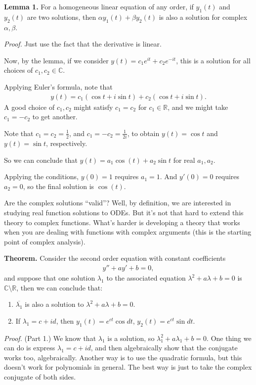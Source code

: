 \documentclass{article}
\begin{document}
{\bf Lemma 1.} For a homogeneous linear equation of any order, if $y_1(t)$ and $y_2(t)$ are two solutions, then $\alpha y_1(t) + \beta y_2(t)$ is also a solution for complex $\alpha, \beta$.

{\it Proof.} Just use the fact that the derivative is linear.

Now, by the lemma, if we consider $y(t) = c_1 e^{it} + c_2 e^{-it}$, this is a solution for all choices of $c_1, c_2 \in \mathbb{C}$.

Applying Euler's formula, note that
\begin{align*}
  y(t) = c_1 (\cos t + i \sin t) + c_2 (\cos t + i \sin t).
\end{align*}
A good choice of $c_1, c_2$ might satisfy $c_1 = c_2$ for $c_1 \in \mathbb{R}$, and we might take $c_1 = - c_2$ to get another.

Note that $c_1 = c_2 = \frac{1}{2}$, and $c_1 = - c_2 = \frac{1}{2i}$, to obtain $y(t) = \cos t$ and $y(t) = \sin t$, respectively.

So we can conclude that $y(t) = a_1 \cos (t) + a_2 \sin t$ for real $a_1, a_2$.

Applying the conditions, $y(0) = 1$ requires $a_1 = 1$.  And $y'(0) = 0$ requires $a_2 = 0$, so the final solution is $\cos(t)$.

Are the complex solutions ``valid''?  Well, by definition, we are interested in studying real function solutions to ODEs.  But it's not that hard to extend this theory to complex functions.  What's harder is developing a theory that works when you are dealing with functions with complex arguments (this is the starting point of complex analysis).

{\bf Theorem.} Consider the second order equation with constant coefficients
\begin{align*}
  y'' + ay' + b = 0,
\end{align*}
and suppose that one solution $\lambda_1$ to the associated equation $\lambda^2 + a \lambda + b = 0$ is $\mathbb{C} \setminus \mathbb{R}$, then we can conclude that:

\begin{enumerate}
  \item $\overline{\lambda_1}$ is also a solution to $\lambda^2 + a \lambda + b = 0$.
  \item If $\lambda_1 = c + id$, then $y_1(t) = e^{ct} \cos dt$, $y_2(t) = e^{ct} \sin dt$.
\end{enumerate}

{\it Proof.} (Part 1.) We know that $\lambda_1$ is a solution, so $\lambda_1^2 + a \lambda_1 + b = 0$.  One thing we can do is express $\lambda_1 = c + id$, and then algebraically show that the conjugate works too, algebraically.  Another way is to use the quadratic formula, but this doesn't work for polynomials in general.  The best way is just to take the complex conjugate of both sides.
\end{document}
